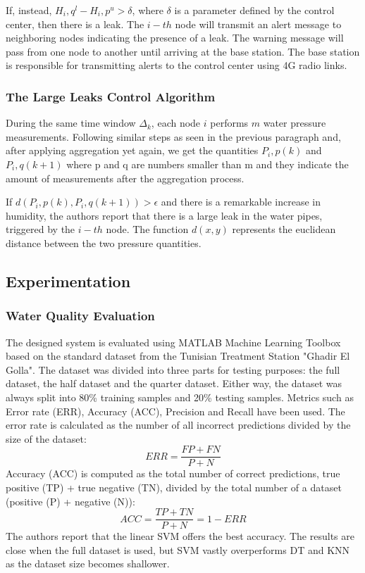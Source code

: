 \documentclass[draft, {\secondLanguage}, english]{volcanica-template}
\begin{document}
If, instead, $H_i,q^l - H_i,p^u > \delta$, where $\delta$ is a parameter defined by the control center, then there is a leak. The $i-th$ node will transmit an alert message to neighboring nodes indicating the presence of a leak. The warning message will pass from one node to another until arriving at the base station. The base station is responsible for transmitting alerts to the control center using 4G radio links.

\subsubsection{The Large Leaks Control Algorithm}
During the same time window $\Delta_k$, each node $i$ performs $m$ water pressure measurements. Following similar steps as seen in the previous paragraph and, after applying aggregation yet again, we get the quantities $P_i,p(k)$ and $P_i,q(k+1)$ where p and q are numbers smaller than m and they indicate the amount of measurements after the aggregation process.

If $d(P_i,p(k), P_i,q(k+1)) > \epsilon$ and there is a remarkable increase in humidity, the authors report that there is a large leak in the water pipes, triggered by the $i-th$ node. The function $d(x, y)$ represents the euclidean distance between the two pressure quantities.

\subsection{Experimentation}
\subsubsection{Water Quality Evaluation}
The designed system is evaluated using MATLAB Machine Learning Toolbox based on the standard dataset from the Tunisian Treatment Station "Ghadir El Golla". The dataset was divided into three parts for testing purposes: the full dataset, the half dataset and the quarter dataset. Either way, the dataset was always split into 80\% training samples and 20\% testing samples. Metrics such as Error rate (ERR), Accuracy (ACC), Precision and Recall have been used. The error rate is calculated as the number of all incorrect predictions divided by the size of the dataset:
\begin{equation}
    ERR = \frac{FP+FN}{P+N}
\end{equation}
Accuracy (ACC) is computed as the total number of correct predictions, true positive (TP) + true negative (TN), divided by the total number of a dataset (positive
(P) + negative (N)):
\begin{equation}
    ACC = \frac{TP+TN}{P+N} = 1 - ERR
\end{equation}
The authors report that the linear SVM offers the best accuracy. The results are close when the full dataset is used, but SVM vastly overperforms DT and KNN as the dataset size becomes shallower.
\end{document}
